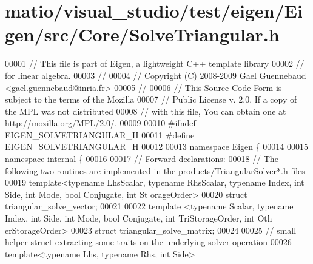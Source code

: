 \hypertarget{matio_2visual__studio_2test_2eigen_2_eigen_2src_2_core_2_solve_triangular_8h_source}{}\section{matio/visual\+\_\+studio/test/eigen/\+Eigen/src/\+Core/\+Solve\+Triangular.h}
\label{matio_2visual__studio_2test_2eigen_2_eigen_2src_2_core_2_solve_triangular_8h_source}

\begin{DoxyCode}
00001 \textcolor{comment}{// This file is part of Eigen, a lightweight C++ template library}
00002 \textcolor{comment}{// for linear algebra.}
00003 \textcolor{comment}{//}
00004 \textcolor{comment}{// Copyright (C) 2008-2009 Gael Guennebaud <gael.guennebaud@inria.fr>}
00005 \textcolor{comment}{//}
00006 \textcolor{comment}{// This Source Code Form is subject to the terms of the Mozilla}
00007 \textcolor{comment}{// Public License v. 2.0. If a copy of the MPL was not distributed}
00008 \textcolor{comment}{// with this file, You can obtain one at http://mozilla.org/MPL/2.0/.}
00009 
00010 \textcolor{preprocessor}{#ifndef EIGEN\_SOLVETRIANGULAR\_H}
00011 \textcolor{preprocessor}{#define EIGEN\_SOLVETRIANGULAR\_H}
00012 
00013 \textcolor{keyword}{namespace }\hyperlink{namespace_eigen}{Eigen} \{ 
00014 
00015 \textcolor{keyword}{namespace }\hyperlink{namespaceinternal}{internal} \{
00016 
00017 \textcolor{comment}{// Forward declarations:}
00018 \textcolor{comment}{// The following two routines are implemented in the products/TriangularSolver*.h files}
00019 \textcolor{keyword}{template}<\textcolor{keyword}{typename} LhsScalar, \textcolor{keyword}{typename} RhsScalar, \textcolor{keyword}{typename} Index, \textcolor{keywordtype}{int} S\textcolor{keywordtype}{id}e, \textcolor{keywordtype}{int} Mode, \textcolor{keywordtype}{bool} Conjugate, \textcolor{keywordtype}{int} St
      orageOrder>
00020 \textcolor{keyword}{struct }triangular\_solve\_vector;
00021 
00022 \textcolor{keyword}{template} <\textcolor{keyword}{typename} Scalar, \textcolor{keyword}{typename} Index, \textcolor{keywordtype}{int} S\textcolor{keywordtype}{id}e, \textcolor{keywordtype}{int} Mode, \textcolor{keywordtype}{bool} Conjugate, \textcolor{keywordtype}{int} TriStorageOrder, \textcolor{keywordtype}{int} Oth
      erStorageOrder>
00023 \textcolor{keyword}{struct }triangular\_solve\_matrix;
00024 
00025 \textcolor{comment}{// small helper struct extracting some traits on the underlying solver operation}
00026 \textcolor{keyword}{template}<\textcolor{keyword}{typename} Lhs, \textcolor{keyword}{typename} Rhs, \textcolor{keywordtype}{int} S\textcolor{keywordtype}{id}e>

\end{DoxyCode}

